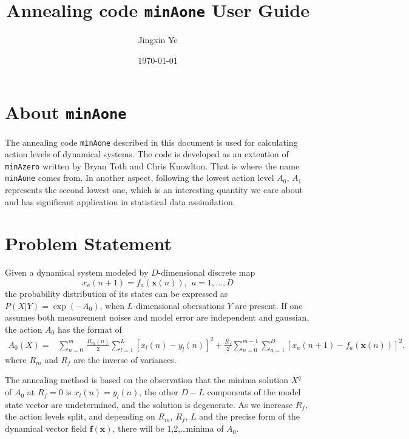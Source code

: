 \documentclass[11pt]{article}
\title{\textbf{Annealing code \texttt{minAone} User Guide}}
\author{Jingxin Ye}
\date{\today}
\begin{document}
\maketitle
\tableofcontents
\newpage
\section{About \texttt{minAone}}
The annealing code \texttt{minAone} described in this document is used for calculating action levels of dynamical systems. The code is developed as an extention of \texttt{minAzero} written by Bryan Toth and Chris Knowlton. That is where the name \texttt{minAone} comes from. In another aspect, following the lowest action level $A_0$, $A_1$ represents the second lowest one, which is an interesting quantity we care about and has significant application in statistical data assimilation.
\section{Problem Statement}
Given a dynamical system modeled by $D$-dimensional discrete map
\[{x_a}(n+1)=f_a(\mathbf{x}(n)),~~a=1,\dots,D\]
the probability distribution of its states can be expressed as $P(X|Y)=\exp(-A_0)$, when $L$-dimensional obersations $Y$ are present.  If one assumes both measurement noises and model error are independent and gaussian, the action $A_0$ has the format of
\begin{align}
A_0(X) = &\sum_{n=0}^m\, \frac{R_m(n)}{2} \sum_{l=1}^L [x_l(n) - y_l(n)]^2 +  \frac{R_f}{2} \sum_{n=0}^{m-1} \sum_{a=1}^D[x_a(n+1) - f_a(\mathbf{x}(n))]^2 .
\label{eq:actionform}
\end{align}
where $R_m$ and $R_f$ are the inverse of variances.

The annealing method is based on the observation that the minima solution $X^q$ of $A_0$ at $R_f=0$ is $x_l(n)=y_l(n)$, the other $D-L$ components of the model state vector are undetermined, and the solution is degenerate. As we increase $R_f$, the action levels split, and depending on $R_m$, $R_f$, $L$ and the precise form of the dynamical vector field $\mathbf{f}(\mathbf{x})$, there will be 1,2,\dots minima of $A_0$.
\end{document}
